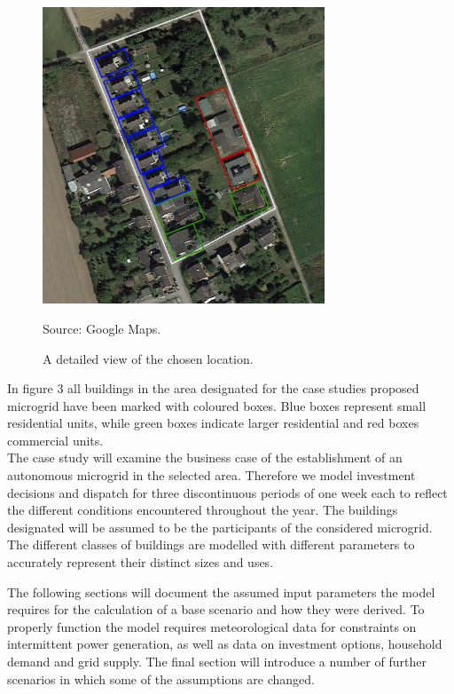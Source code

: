 \documentclass[
	11pt,								%
	DIV10,								%
	a4paper,         					%
	oneside,							%
	headheight=20pt,					%
	footheight=20pt,					%
    parskip=full,						%
    listof=totoc,						%
	bibliography=totoc,					%
	index=totoc,						%
]{scrartcl}
\begin{document}
\begin{figure}[H]
	\centering
	\includegraphics[width=0.75\textwidth]{pictures/Detail_Layout.png}
	\caption{A detailed view of the chosen location.}
	\label{morschenich_detail}
	\flushleft\quad\quad\footnotesize{Source: Google Maps.}
\end{figure}	

In figure 3 all buildings in the area designated for the case studies proposed microgrid have been marked with coloured boxes. Blue boxes represent small residential units, while green boxes indicate larger residential and red boxes commercial units.
\\
The case study will examine the business case of the establishment of an autonomous microgrid in the selected area. Therefore we model investment decisions and dispatch for three discontinuous periods of one week each to reflect the different conditions encountered throughout the year. The buildings designated will be assumed to be the participants of the considered microgrid. The different classes of buildings are modelled with different parameters to accurately represent their distinct sizes and uses.

 The following sections will document the assumed input parameters the model requires for the calculation of a base scenario and how they were derived. To properly function the model requires meteorological data for constraints on intermittent power generation, as well as data on investment options, household demand and grid supply. The final section will introduce a number of further scenarios in which some of the assumptions are changed.
\end{document}
